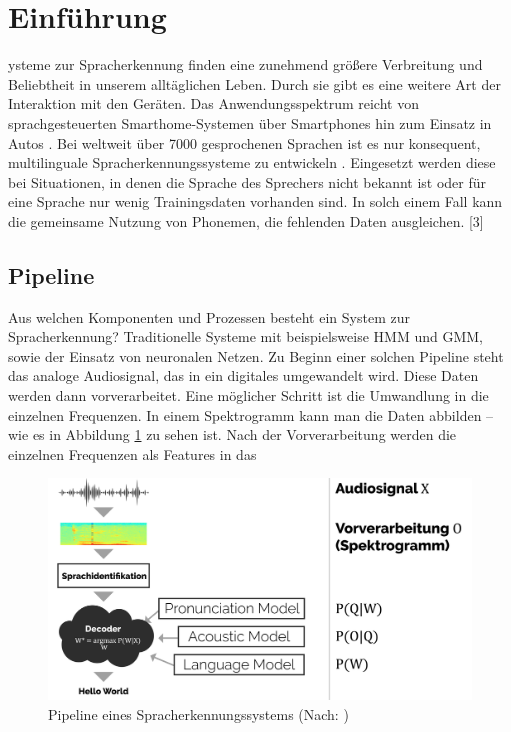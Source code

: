 \section{Einführung}\label{sec:introduction}
ysteme zur Spracherkennung finden eine zunehmend größere Verbreitung und Beliebtheit in unserem alltäglichen Leben.
Durch sie gibt es eine weitere Art der Interaktion mit den Geräten.
Das Anwendungsspektrum reicht von sprachgesteuerten Smarthome-Systemen über Smartphones hin zum Einsatz in Autos \cite{Yu.2014}.
Bei weltweit über 7000 gesprochenen Sprachen ist es nur konsequent, multilinguale Spracherkennungssysteme zu entwickeln \cite{Gary.2018}.
Eingesetzt werden diese bei Situationen, in denen die Sprache des Sprechers nicht bekannt ist oder für eine Sprache nur wenig
Trainingsdaten vorhanden sind. In solch einem Fall kann die gemeinsame Nutzung von Phonemen, die fehlenden Daten ausgleichen. [3]

\subsection{Pipeline}
Aus welchen Komponenten und Prozessen besteht ein System zur Spracherkennung?
Traditionelle Systeme mit beispielsweise HMM und GMM, sowie der Einsatz von neuronalen Netzen.
Zu Beginn einer solchen Pipeline steht das analoge Audiosignal, das in ein digitales umgewandelt wird.
Diese Daten werden dann vorverarbeitet. Eine möglicher Schritt ist die Umwandlung in die einzelnen Frequenzen.
In einem Spektrogramm kann man die Daten abbilden – wie es in Abbildung \ref{fig:pipeline} zu sehen ist.
Nach der Vorverarbeitung werden die einzelnen Frequenzen als Features in das

\begin{figure}[h!]
    \centering
    \includegraphics[width=1\linewidth]{images/Presentation-01-01}
    \caption{Pipeline eines Spracherkennungssystems (Nach: ) }%
    \label{fig:pipeline}
\end{figure}

